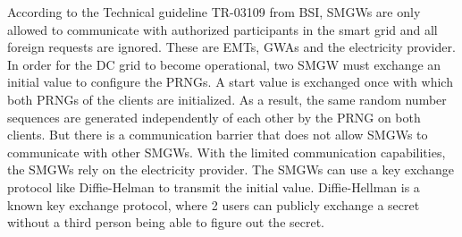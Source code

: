 According to the Technical guideline TR-03109 from BSI, SMGWs are only allowed to communicate with authorized participants in the smart grid and all foreign requests are ignored. These are EMTs, GWAs and the electricity provider. In order for the DC grid to become operational, two SMGW must exchange an initial value to configure the PRNGs. A start value is exchanged once with which both PRNGs of the clients are initialized. As a result, the same random number sequences are generated independently of each other by the PRNG on both clients. But there is a communication barrier that does not allow SMGWs to communicate with other SMGWs. With the limited communication capabilities, the SMGWs rely on the electricity provider. The SMGWs can use a key exchange protocol like Diffie-Helman to transmit the initial value. %
Diffie-Hellman is a known key exchange protocol, where 2 users can publicly exchange a secret without a third person being able to figure out the secret.

